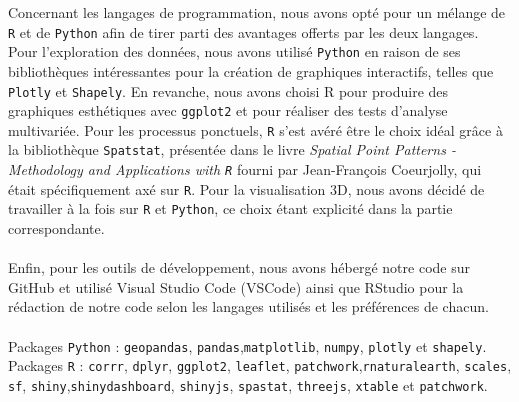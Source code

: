 \documentclass[12pt]{article}
\begin{document}
Concernant les langages de programmation, nous avons opté pour un mélange de \texttt{R} et de \texttt{Python} afin de tirer parti des avantages offerts par les deux langages. Pour l'exploration des données, nous avons utilisé \texttt{Python} en raison de ses bibliothèques intéressantes pour la création de graphiques interactifs, telles que \texttt{Plotly} et \texttt{Shapely}. En revanche, nous avons choisi R pour produire des graphiques esthétiques avec \texttt{ggplot2} et pour réaliser des tests d'analyse multivariée. Pour les processus ponctuels, \texttt{R} s'est avéré être le choix idéal grâce à la bibliothèque \texttt{Spatstat},  présentée dans le livre \textit{Spatial Point Patterns - Methodology and Applications with \texttt{R}} \cite{analysing_spacial_points} fourni par Jean-François Coeurjolly, qui était spécifiquement axé sur \texttt{R}. Pour la visualisation 3D, nous avons décidé de travailler à la fois sur \texttt{R} et \texttt{Python}, ce choix étant explicité dans la partie correspondante.\\
\\
Enfin, pour les outils de développement, nous avons hébergé notre code sur GitHub et utilisé Visual Studio Code (VSCode) ainsi que RStudio pour la rédaction de notre code selon les langages utilisés et les préférences de chacun.\\
\\
Packages \texttt{Python} : \texttt{geopandas}, \texttt{pandas},\texttt{matplotlib}, \texttt{numpy}, \texttt{plotly} et \texttt{shapely}.\\
Packages \texttt{R} : \texttt{corrr}, \texttt{dplyr}, \texttt{ggplot2}, \texttt{leaflet}, \texttt{patchwork},\texttt{rnaturalearth}, \texttt{scales}, \texttt{sf}, \texttt{shiny},\texttt{shinydashboard}, \texttt{shinyjs}, \texttt{spastat}, \texttt{threejs}, \texttt{xtable} et 
\texttt{patchwork}.
\newpage
\end{document}
